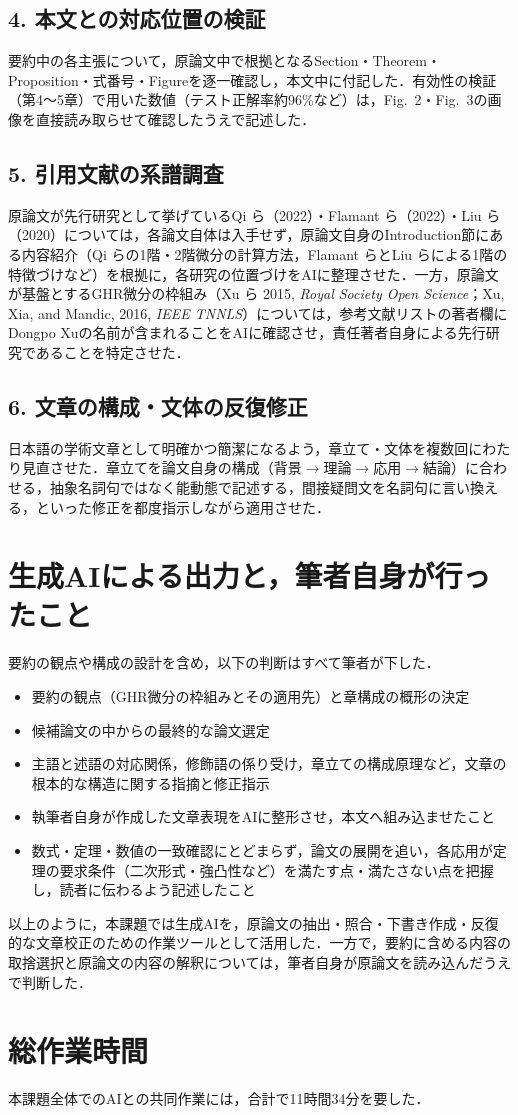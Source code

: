 \documentclass[twocolumn, 10pt]{jsarticle}
\begin{document}
\subsection*{4. 本文との対応位置の検証}

要約中の各主張について，原論文中で根拠となるSection・Theorem・Proposition・式番号・Figureを逐一確認し，本文中に付記した．有効性の検証（第4〜5章）で用いた数値（テスト正解率約96\%など）は，Fig.\ 2・Fig.\ 3の画像を直接読み取らせて確認したうえで記述した．

\subsection*{5. 引用文献の系譜調査}

原論文が先行研究として挙げているQi ら（2022）・Flamant ら（2022）・Liu ら（2020）については，各論文自体は入手せず，原論文自身のIntroduction節にある内容紹介（Qi らの1階・2階微分の計算方法，Flamant らとLiu らによる1階の特徴づけなど）を根拠に，各研究の位置づけをAIに整理させた．一方，原論文が基盤とするGHR微分の枠組み（Xu ら 2015, \textit{Royal Society Open Science}；Xu, Xia, and Mandic, 2016, \textit{IEEE TNNLS}）については，参考文献リストの著者欄にDongpo Xuの名前が含まれることをAIに確認させ，責任著者自身による先行研究であることを特定させた．

\subsection*{6. 文章の構成・文体の反復修正}

日本語の学術文章として明確かつ簡潔になるよう，章立て・文体を複数回にわたり見直させた．章立てを論文自身の構成（背景\(\to\)理論\(\to\)応用\(\to\)結論）に合わせる，抽象名詞句ではなく能動態で記述する，間接疑問文を名詞句に言い換える，といった修正を都度指示しながら適用させた．

\section*{生成AIによる出力と，筆者自身が行ったこと}

要約の観点や構成の設計を含め，以下の判断はすべて筆者が下した．

\begin{itemize}
    \item 要約の観点（GHR微分の枠組みとその適用先）と章構成の概形の決定
    \item 候補論文の中からの最終的な論文選定
    \item 主語と述語の対応関係，修飾語の係り受け，章立ての構成原理など，文章の根本的な構造に関する指摘と修正指示
    \item 執筆者自身が作成した文章表現をAIに整形させ，本文へ組み込ませたこと
    \item 数式・定理・数値の一致確認にとどまらず，論文の展開を追い，各応用が定理の要求条件（二次形式・強凸性など）を満たす点・満たさない点を把握し，読者に伝わるよう記述したこと
\end{itemize}

以上のように，本課題では生成AIを，原論文の抽出・照合・下書き作成・反復的な文章校正のための作業ツールとして活用した．一方で，要約に含める内容の取捨選択と原論文の内容の解釈については，筆者自身が原論文を読み込んだうえで判断した．

\section*{総作業時間}

本課題全体でのAIとの共同作業には，合計で11時間34分を要した．
\end{document}
